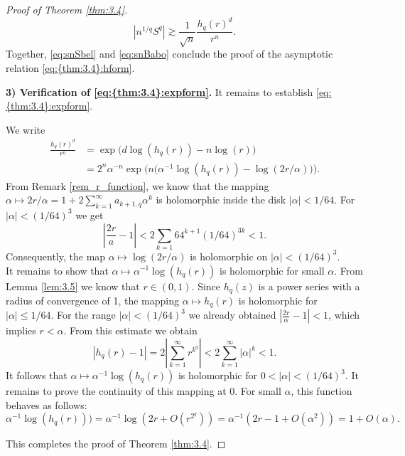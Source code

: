 \documentclass[a4paper,twoside, reqno]{amsart}
\numberwithin{equation}{section}
\theoremstyle{definition}%
\theoremstyle{definition}
\theoremstyle{definition}%
\theoremstyle{definition}
\begin{document}
\begin{proof}[Proof of Theorem \ref{thm:3.4}]
\begin{equation} \label{eq:snSbel}
    |n^{1/q}S^q| \gtrsim \frac{1}{\sqrt{n}} \frac{h_q(r)^d}{r^n}.
\end{equation}
Together, \eqref{eq:snSbel} and \eqref{eq:snBabo} conclude the proof of the asymptotic relation \eqref{eq:{thm:3.4}:hform}.

\noindent 
{\bf 3) Verification of \eqref{eq:{thm:3.4}:expform}.} It remains to establish \eqref{eq:{thm:3.4}:expform}. 

We write
    \begin{equation}
    \label{eq:thm:3.4expformproof}
    \begin{split}
    \frac{h_q(r)^d}{r^n}
    &= \exp \Big( d\log(h_q(r))- n \log(r) \Big)
  \\
    &= 2^n \alpha^{-n} \exp\Big(n\Big(\alpha^{-1} \log(h_q(r)) - \log(2r/\alpha)\Big) \Big).
    \end{split}
\end{equation}
From Remark \ref{rem_r_function}, we know that the mapping $\alpha \mapsto 2r/\alpha = 1 +2\sum_{k=1}^{\infty} a_{k+1,q}\alpha^k$ is holomorphic inside the disk $|\alpha| < 1/64$. For $|\alpha| < (1/64)^3$ we get
\[
\left|\frac{2r}{a}-1\right| < 2\sum_{k=1} 64^{k+1}(1/64)^{3k} < 1.
\]
Consequently, the map $\alpha\mapsto\log(2r/\alpha)$ is holomorphic on $|\alpha|<(1/64)^3$.
\\
It remains to show that $\alpha\mapsto \alpha^{-1} \log(h_q(r))$ is holomorphic for small $\alpha$.
From Lemma \ref{lem:3.5} we know that $r\in(0,1)$. Since $h_q(z)$ is a power series with a radius of convergence of 1, the mapping
$\alpha\mapsto h_q(r)$ is holomorphic for $|\alpha|\leq 1/64.$ For the range $|\alpha| < (1/64)^3$ we already obtained $|\frac{2r}{\alpha}-1| < 1$, which implies $r < \alpha.$ From this estimate we obtain
\[
|h_q(r)-1| = 2|\sum_{k=1}^{\infty}r^{k^q}| < 2\sum_{k=1}^{\infty} |\alpha|^k < 1.
\]
It follows that $\alpha\mapsto \alpha^{-1} \log(h_q(r))$ is holomorphic for $0<|\alpha|< (1/64)^3$.
It remains to prove the continuity of this mapping at 0. For small $\alpha$, this function behaves as follows:
\[
 \alpha^{-1} \log(h_q(r))) = \alpha^{-1}\log(2r + O(r^{2^q})) = \alpha^{-1}(2r-1 + O(\alpha^{2})) = 1 + O(\alpha).
\]


    This completes the proof of Theorem \ref{thm:3.4}.
    

\end{proof}

\normalsize
\end{document}
